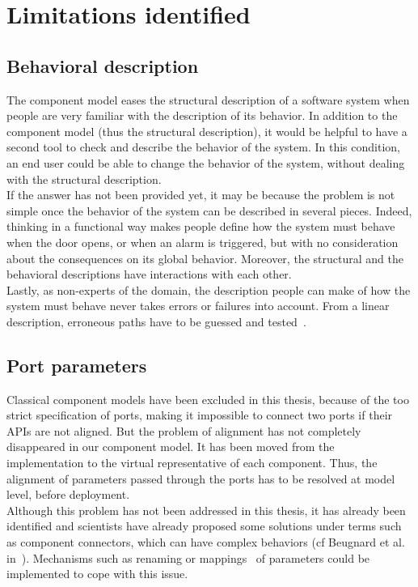 \section{Limitations identified}

\subsection{Behavioral description}

The component model eases the structural description of a software system when people are very familiar with the description of its behavior. In addition to the component model (thus the structural description), it would be helpful to have a second tool to check and describe the behavior of the system. In this condition, an end user could be able to change the behavior of the system, without dealing with the structural description.\\
If the answer has not been provided yet, it may be because the problem is not simple once the behavior of the system can be described in several pieces. Indeed, thinking in a functional way makes people define how the system must behave when the door opens, or when an alarm is triggered, but with no consideration about the consequences on its global behavior. Moreover, the structural and the behavioral descriptions have interactions with each other.\\
Lastly, as non-experts of the domain, the description people can make of how the system must behave never takes errors or failures into account. From a linear description, erroneous paths have to be guessed and tested~\cite{Offutt:1997}.

\subsection{Port parameters}
Classical component models have been excluded in this thesis, because of the too strict specification of ports, making it impossible to connect two ports if their APIs are not aligned. But the problem of alignment has not completely disappeared in our component model. It has been moved from the implementation to the virtual representative of each component. Thus, the alignment of parameters passed through the ports has to be resolved at model level, before deployment.\\
Although this problem has not been addressed in this thesis, it has already been identified and scientists have already proposed some solutions under terms such as component connectors, which can have complex behaviors (cf Beugnard et al. in~\cite{Matougui:2005}). Mechanisms such as renaming or mappings~\cite{Clavreul:2010} of parameters could be implemented to cope with this issue.

